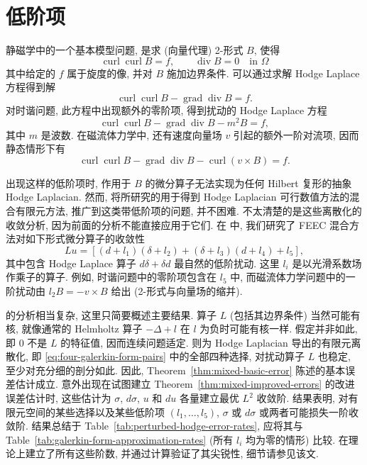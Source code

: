 \section{低阶项}\label{sec:lower-order-terms}

静磁学中的一个基本模型问题, 是求 (向量代理) 2-形式 $B$, 使得
\[
\operatorname{curl}\operatorname{curl}B=f,\qquad\operatorname{div}B=0\quad\text{in }\Omega
\]
其中给定的 $f$ 属于旋度的像, 并对 $B$ 施加边界条件. 可以通过求解 Hodge Laplace 方程得到解
\[
\operatorname{curl}\operatorname{curl}B-\operatorname{grad}\operatorname{div}B=f.
\]
对时谐问题, 此方程中出现额外的零阶项, 得到扰动的 Hodge Laplace 方程
\[
\operatorname{curl}\operatorname{curl}B-\operatorname{grad}\operatorname{div}B-m^2B=f,
\]
其中 $m$ 是波数. 在磁流体力学中, 还有速度向量场 $v$ 引起的额外一阶对流项, 因而静态情形下有
\[
\operatorname{curl}\operatorname{curl}B-\operatorname{grad}\operatorname{div}B-\operatorname{curl}(v\times B)=f.
\]

出现这样的低阶项时, 作用于 $B$ 的微分算子无法实现为任何 Hilbert 复形的抽象 Hodge Laplacian. 然而, 将所研究的用于得到 Hodge Laplacian 可行数值方法的混合有限元方法, 推广到这类带低阶项的问题, 并不困难. 不太清楚的是这些离散化的收敛分析, 因为前面的分析不能直接应用于它们. 在  中, 我们研究了 FEEC 混合方法对如下形式微分算子的收敛性
\[
Lu=[(d+l_1)(\delta+l_2)+(\delta+l_3)(d+l_4)+l_5],
\]
其中包含 Hodge Laplace 算子 $d\delta+\delta d$ 最自然的低阶扰动. 这里 $l_i$ 是以光滑系数场作乘子的算子. 例如, 时谐问题中的零阶项包含在 $l_5$ 中, 而磁流体力学问题中的一阶扰动由 $l_2B=-v\times B$ 给出 (2-形式与向量场的缩并).

 的分析相当复杂, 这里只简要概述主要结果. 算子 $L$ (包括其边界条件) 当然可能有核, 就像通常的 Helmholtz 算子 $-\Delta+l$ 在 $l$ 为负时可能有核一样. 假定并非如此, 即 $0$ 不是 $L$ 的特征值, 因而连续问题适定. 则为 Hodge Laplacian 导出的有限元离散化, 即 \eqref{eq:four-galerkin-form-pairs} 中的全部四种选择, 对扰动算子 $L$ 也稳定, 至少对充分细的剖分如此. 因此, Theorem~\ref{thm:mixed-basic-error} 陈述的基本误差估计成立. 意外出现在试图建立 Theorem~\ref{thm:mixed-improved-errors} 的改进误差估计时, 这些估计为 $\sigma$, $d\sigma$, $u$ 和 $du$ 各量建立最优 $L^2$ 收敛阶. 结果表明, 对有限元空间的某些选择以及某些低阶项 $(l_1,\ldots,l_5)$, $\sigma$ 或 $d\sigma$ 或两者可能损失一阶收敛阶. 结果总结于 Table~\ref{tab:perturbed-hodge-error-rates}, 应将其与 Table~\ref{tab:galerkin-form-approximation-rates} (所有 $l_i$ 均为零的情形) 比较.  在理论上建立了所有这些阶数, 并通过计算验证了其尖锐性, 细节请参见该文.

